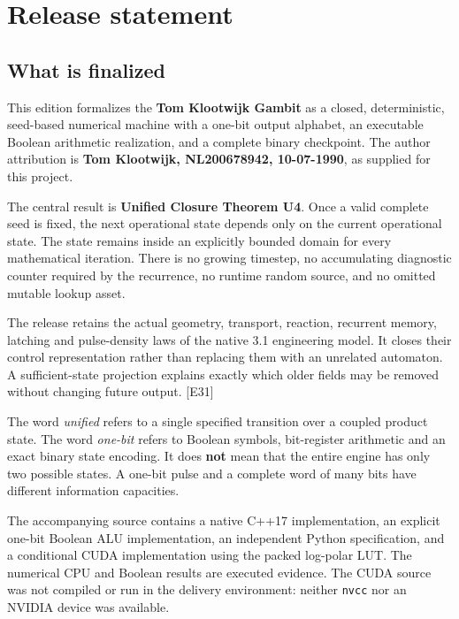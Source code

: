 \documentclass[11pt,a4paper]{article}
\begin{document}
\section{Release statement}\label{release-statement}

\subsection{What is finalized}\label{what-is-finalized}

This edition formalizes the \textbf{Tom Klootwijk Gambit} as a closed,
deterministic, seed-based numerical machine with a one-bit output
alphabet, an executable Boolean arithmetic realization, and a complete
binary checkpoint. The author attribution is \textbf{Tom Klootwijk,
NL200678942, 10-07-1990}, as supplied for this project.

The central result is \textbf{Unified Closure Theorem U4}. Once a valid
complete seed is fixed, the next operational state depends only on the
current operational state. The state remains inside an explicitly
bounded domain for every mathematical iteration. There is no growing
timestep, no accumulating diagnostic counter required by the recurrence,
no runtime random source, and no omitted mutable lookup asset.

The release retains the actual geometry, transport, reaction, recurrent
memory, latching and pulse-density laws of the native 3.1 engineering
model. It closes their control representation rather than replacing them
with an unrelated automaton. A sufficient-state projection explains
exactly which older fields may be removed without changing future
output. {[}E31{]}

The word \emph{unified} refers to a single specified transition over a
coupled product state. The word \emph{one-bit} refers to Boolean
symbols, bit-register arithmetic and an exact binary state encoding. It
does \textbf{not} mean that the entire engine has only two possible
states. A one-bit pulse and a complete word of many bits have different
information capacities.

The accompanying source contains a native C++17 implementation, an
explicit one-bit Boolean ALU implementation, an independent Python
specification, and a conditional CUDA implementation using the packed
log-polar LUT. The numerical CPU and Boolean results are executed
evidence. The CUDA source was not compiled or run in the delivery
environment: neither \texttt{nvcc} nor an NVIDIA device was available.
\end{document}
